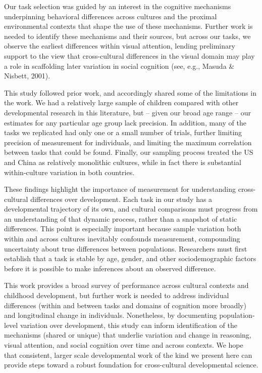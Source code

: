 \documentclass[10pt, letterpaper]{article}
\begin{document}
Our task selection was guided by an interest in the cognitive mechanisms
underpinning behavioral differences across cultures and the proximal
environmental contexts that shape the use of these mechanisms. Further
work is needed to identify these mechanisms and their sources, but
across our tasks, we observe the earliest differences within visual
attention, lending preliminary support to the view that cross-cultural
differences in the visual domain may play a role in scaffolding later
variation in social cognition (see, e.g., Masuda \& Nisbett, 2001).

This study followed prior work, and accordingly shared some of the
limitations in the work. We had a relatively large sample of children
compared with other developmental research in this literature, but --
given our broad age range -- our estimates for any particular age group
lack precision. In addition, many of the tasks we replicated had only
one or a small number of trials, further limiting precision of
measurement for individuals, and limiting the maximum correlation
between tasks that could be found. Finally, our sampling process treated
the US and China as relatively monolithic cultures, while in fact there
is substantial within-culture variation in both countries.

These findings highlight the importance of measurement for understanding
cross-cultural differences over development. Each task in our study has
a developmental trajectory of its own, and cultural comparisons must
progress from an understanding of that dynamic process, rather than a
snapshot of static differences. This point is especially important
because sample variation both within and across cultures inevitably
confounds measurement, compounding uncertainty about true differences
between populations. Researchers must first establish that a task is
stable by age, gender, and other sociodemographic factors before it is
possible to make inferences about an observed difference.

This work provides a broad survey of performance across cultural
contexts and childhood development, but further work is needed to
address individual differences (within and between tasks and domains of
cognition more broadly) and longitudinal change in individuals.
Nonetheless, by documenting population-level variation over development,
this study can inform identification of the mechanisms (shared or
unique) that underlie variation and change in reasoning, visual
attention, and social cognition over time and across contexts. We hope
that consistent, larger scale developmental work of the kind we present
here can provide steps toward a robust foundation for cross-cultural
developmental science.
\end{document}

